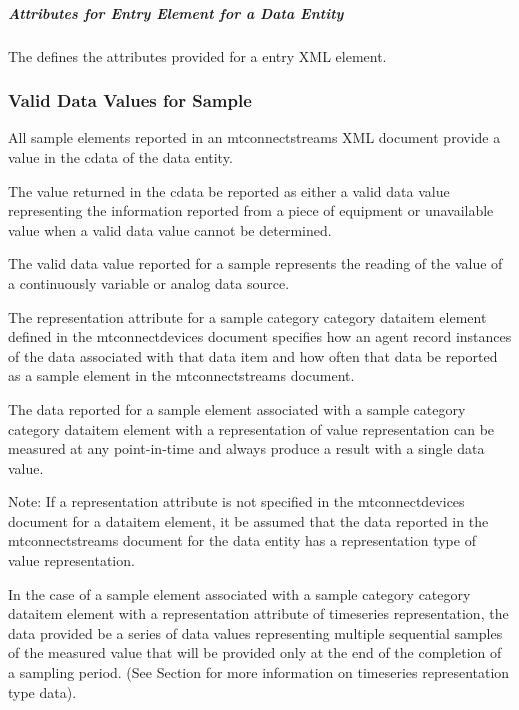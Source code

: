 \subparagraph{Attributes for Entry Element for a Data Entity}\mbox{}
\label{sec:Attributes for Entry Element for a Data Entity}

The  defines the attributes provided for a \gls{entry} XML element. 




\subsubsection{Valid Data Values for Sample}

All \gls{sample} elements reported in an \gls{mtconnectstreams} XML document \must provide a value in the \gls{cdata} of the \gls{data entity}.

The value returned in the \gls{cdata} \must be reported as either a \gls{valid data value} representing the information reported from a piece of equipment or \gls{unavailable value} when a \gls{valid data value} cannot be determined.

The \gls{valid data value} reported for a \gls{sample} represents the reading of the value of a continuously variable or analog data source.

The \gls{representation} attribute for a \gls{sample category} category \gls{dataitem} element defined in the \gls{mtconnectdevices} document specifies how an \gls{agent} \must record instances of the data associated with that data item and how often that data \must be reported as a \gls{sample} element in the \gls{mtconnectstreams} document.

The data reported for a \gls{sample} element associated with a \gls{sample category} category \gls{dataitem} element with a \gls{representation} of \gls{value representation} can be measured at any point-in-time and \must always produce a result with a single data value.  

\begin{note}
Note: If a \gls{representation} attribute is not specified in the \gls{mtconnectdevices} document for a \gls{dataitem} element, it \must be assumed that the data reported in the \gls{mtconnectstreams} document for the \gls{data entity} has a \gls{representation} type of \gls{value representation}.

\end{note}

In the case of a \gls{sample} element associated with a \gls{sample category} category \gls{dataitem} element with a \gls{representation} attribute of \gls{timeseries representation}, the data provided \must be a series of data values representing multiple sequential samples of the measured value that will be provided only at the end of the completion of a sampling period.   (See Section  for more information on \gls{timeseries representation} type data).

